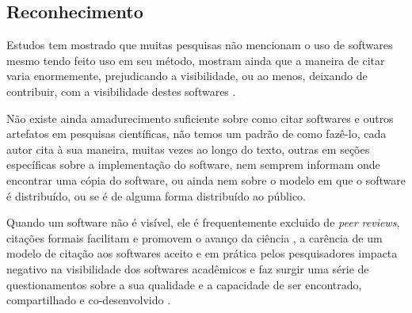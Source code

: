 
\subsection{Reconhecimento}


Estudos tem mostrado que muitas pesquisas não mencionam o uso de softwares
mesmo tendo feito uso em seu método, mostram ainda que a maneira de citar
varia enormemente, prejudicando a visibilidade, ou ao menos, deixando de
contribuir, com a visibilidade destes softwares \cite{howison2016software}.

Não existe ainda amadurecimento suficiente sobre como citar softwares e
outros artefatos em pesquisas científicas, não temos um padrão de como fazê-lo,
cada autor cita à sua maneira, muitas vezes ao longo do texto, outras em seções
específicas sobre a implementação do software, nem semprem informam onde
encontrar uma cópia do software, ou ainda nem sobre o modelo em que o software
é distribuído, ou se é de alguma forma distribuído ao público.


Quando um software não é visível, ele é frequentemente excluido de {\it peer
reviews}, citações formais facilitam e promovem o avanço da ciência \cite{allen2014credit}, a carência
de um modelo de citação aos softwares aceito e em prática pelos pesquisadores
impacta negativo na visibilidade dos softwares acadêmicos e faz surgir uma
série de questionamentos sobre a sua qualidade e a capacidade de ser
encontrado, compartilhado e co-desenvolvido \cite{howison2013,
katz2014transitive} \cite{howison2016software}.

